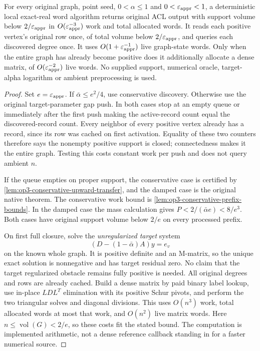 \begin{theorem}
\label{thm:op3-conservative-local-reference}
For every original graph, point seed, $0<\alpha\leq1$ and
$0<\varepsilon_{\mathrm{appr}}<1$, a deterministic local exact-real word algorithm
returns original ACL output with support volume below $2/\varepsilon_{\mathrm{appr}}$
in $O(\varepsilon_{\mathrm{appr}}^{-3})$ work and total allocated words. It reads each
positive vertex's original row once, of total volume below
$2/\varepsilon_{\mathrm{appr}}$, and queries each discovered degree once. It uses
$O(1+\varepsilon_{\mathrm{appr}}^{-1})$ live graph-state words. Only when the entire
graph has already become positive does it additionally allocate a
dense matrix, of $O(\varepsilon_{\mathrm{appr}}^{-2})$ live words. No supplied support,
numerical oracle, target-alpha logarithm or ambient preprocessing is used.
\end{theorem}
\begin{proof}
Set $e=\varepsilon_{\mathrm{appr}}$. If $\bar\alpha\leq e^2/4$, use conservative
discovery. Otherwise use the original target-parameter gap push. In
both cases stop at an empty queue or immediately after the first push
making the active-record count equal the discovered-record count.
Every neighbor of every positive vertex already has a record, since
its row was cached on first activation. Equality of these two counters
therefore says the nonempty positive support is closed; connectedness
makes it the entire graph. Testing this costs constant work per push
and does not query ambient $n$.

If the queue empties on proper support, the conservative case is
certified by \cref{lem:op3-conservative-upward-transfer}, and the
damped case is the original native theorem. The conservative work
bound is \cref{lem:op3-conservative-prefix-bounds}. In the damped
case the mass calculation gives
$P<2/(\bar\alpha e)<8/e^3$. Both cases have original support volume
below $2/e$ on every processed prefix.

On first full closure, solve the \emph{unregularized target} system
\[
 (D-(1-\bar\alpha)A)y=e_v
\]
on the known whole graph. It is positive definite and an M-matrix,
so the unique exact solution is nonnegative and has target residual
zero. No claim that the target regularized obstacle remains fully
positive is needed. All original degrees and rows are already cached.
Build a dense matrix by paid binary label lookup, use in-place
$LDL^T$ elimination with its positive Schur pivots, and perform the two
triangular solves and diagonal divisions. This uses $O(n^3)$ work,
total allocated words at most that work, and $O(n^2)$ live matrix words.
Here $n\leq\operatorname{vol}(G)<2/e$, so these costs fit the stated
bound. The computation is implemented arithmetic, not a dense reference
callback standing in for a faster numerical source.


\end{proof}
